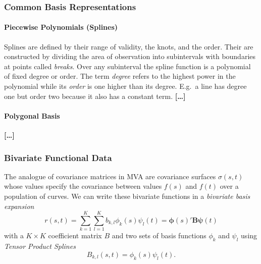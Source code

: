 \subsubsection{Common Basis Representations}
\paragraph{Piecewise Polynomials (Splines)}
Splines are defined by their range of validity, the knots, and the order.
Their are constructed by dividing the area of observation into subintervals with boundaries at points called \textit{breaks}.
Over any subinterval the spline function is a polynomial of fixed degree or order.
The term \textit{degree} refers to the highest power in the polynomial while its \textit{order} is one higher than its degree.
E.g.\ a line has degree one but order two because it also has a constant term. 
\textbf{[\dots]}


\paragraph{Polygonal Basis}
\textbf{[\dots]}


\subsubsection{Bivariate Functional Data}
The analogue of covariance matrices in MVA are covariance surfaces $\sigma(s,t)$ whose values specify the covariance between values $f(s)$ and $f(t)$ over a population of curves.
We can write these bivariate functions in a \textit{bivariate basis expansion} $$ r(s,t) = \sum_{k=1}^K \sum_{l=1}^K b_{k,l} \phi_k(s) \psi_l(t) 
  = \bm{\phi}(s)' \bm{B} \bm{\psi}(t) $$
with a $K \times K$ coefficient matrix $B$ and two sets of basis functions $\phi_k$ and $\psi_l$ using \textit{Tensor Product Splines}
$$ B_{k,l}(s,t) = \phi_k(s) \psi_l(t).$$
